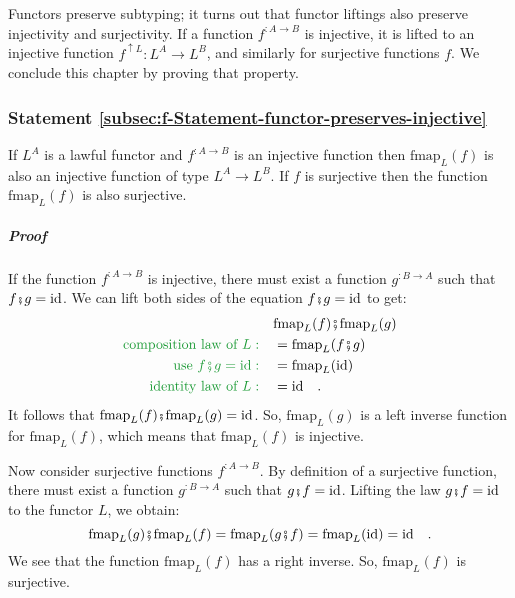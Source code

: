 Functors preserve subtyping; it turns out that functor liftings also
preserve injectivity and surjectivity. If a function $f^{:A\rightarrow B}$
is injective, it is lifted to an injective function $f^{\uparrow L}:L^{A}\rightarrow L^{B}$,
and similarly for surjective functions $f$. We conclude this chapter
by proving that property.

\subsubsection{Statement \label{subsec:f-Statement-functor-preserves-injective}\ref{subsec:f-Statement-functor-preserves-injective}}

If $L^{A}$ is a lawful functor and $f^{:A\rightarrow B}$ is an injective
function then $\text{fmap}_{L}(f)$ is also an injective function
of type $L^{A}\rightarrow L^{B}$. If $f$ is surjective then the
function $\text{fmap}_{L}(f)$ is also surjective.

\subparagraph{Proof}

If the function $f^{:A\rightarrow B}$ is injective, there must exist
a function $g^{:B\rightarrow A}$ such that $f\bef g=\text{id}$.
We can lift both sides of the equation $f\bef g=\text{id}$ to get:
\begin{align*}
 & \text{fmap}_{L}(f)\bef\text{fmap}_{L}(g)\\
{\color{greenunder}\text{composition law of }L:}\quad & =\text{fmap}_{L}(f\bef g)\\
{\color{greenunder}\text{use }f\bef g=\text{id}:}\quad & =\text{fmap}_{L}(\text{id})\\
{\color{greenunder}\text{identity law of }L:}\quad & =\text{id}\quad.
\end{align*}
It follows that $\text{fmap}_{L}(f)\bef\text{fmap}_{L}(g)=\text{id}$.
So, $\text{fmap}_{L}(g)$ is a left inverse function for $\text{fmap}_{L}(f)$,
which means that $\text{fmap}_{L}(f)$ is injective.

Now consider surjective functions $f^{:A\rightarrow B}$. By definition
of a surjective function, there must exist a function $g^{:B\rightarrow A}$
such that $g\bef f=\text{id}$. Lifting the law $g\bef f=\text{id}$
to the functor $L$, we obtain:
\[
\text{fmap}_{L}(g)\bef\text{fmap}_{L}(f)=\text{fmap}_{L}(g\bef f)=\text{fmap}_{L}(\text{id})=\text{id}\quad.
\]
We see that the function $\text{fmap}_{L}(f)$ has a right inverse.
So, $\text{fmap}_{L}(f)$ is surjective.

